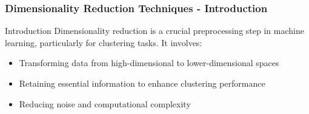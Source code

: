 \documentclass[aspectratio=169]{beamer}
\begin{document}
\begin{frame}[fragile]
    \frametitle{Dimensionality Reduction Techniques - Introduction}
    \begin{block}{Introduction}
        Dimensionality reduction is a crucial preprocessing step in machine learning, particularly for clustering tasks. It involves:
        \begin{itemize}
            \item Transforming data from high-dimensional to lower-dimensional spaces
            \item Retaining essential information to enhance clustering performance
            \item Reducing noise and computational complexity
        \end{itemize}
    \end{block}
\end{frame}
\end{document}
